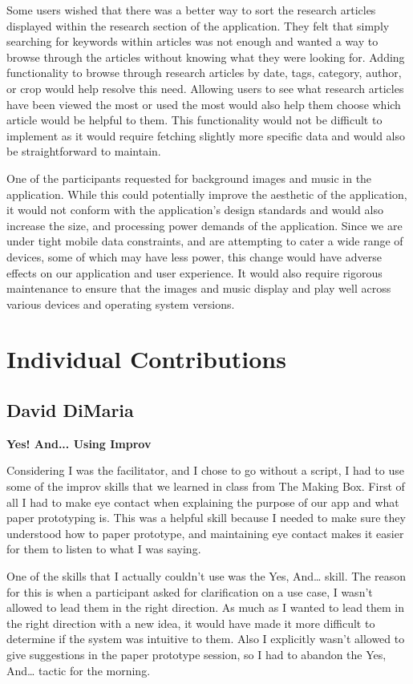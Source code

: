 \documentclass[12pt,letterpaper]{article}
\begin{document}
Some users wished that there was a better way to sort the research articles displayed within the research section of the application. They felt that simply searching for keywords within articles was not enough and wanted a way to browse through the articles without knowing what they were looking for. Adding functionality to browse through research articles by date, tags, category, author, or crop would help resolve this need. Allowing users to see what research articles have been viewed the most or used the most would also help them choose which article would be helpful to them. This functionality would not be difficult to implement as it would require fetching slightly more specific data and would also be straightforward to maintain.\par
One of the participants requested for background images and music in the application. While this could potentially improve the aesthetic of the application, it would not conform with the application's design standards and would also increase the size, and processing power demands of the application. Since we are under tight mobile data constraints, and are attempting to cater a wide range of devices, some of which may have less power, this change would have adverse effects on our application and user experience. It would also require rigorous maintenance to ensure that the images and music display and play well across various devices and operating system versions. 

\clearpage
\section{Individual Contributions}
\subsection{David DiMaria}
\textbf{Yes! And... Using Improv}\par
Considering I was the facilitator, and I chose to go without a script, I had to use some of the improv skills that we learned in class from The Making Box. First of all I had to make eye contact when explaining the purpose of our app and what paper prototyping is. This was a helpful skill because I needed to make sure they understood how to paper prototype, and maintaining eye contact makes it easier for them to listen to what I was saying.\par
One of the skills that I actually couldn’t use was the Yes, And… skill. The reason for this is when a participant asked for clarification on a use case, I wasn’t allowed to lead them in the right direction. As much as I wanted to lead them in the right direction with a new idea, it would have made it more difficult to determine if the system was intuitive to them. Also I explicitly wasn’t allowed to give suggestions in the paper prototype session, so I had to abandon the Yes, And… tactic for the morning. 
\end{document}
